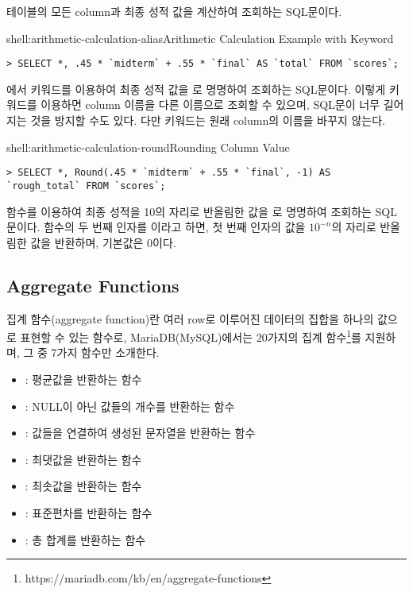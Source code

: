 \은  테이블의 모든 column과 최종 성적 값을 계산하여 조회하는 SQL문이다.

\begin{shellenv}{shell:arithmetic-calculation-alias}{Arithmetic Calculation Example with  Keyword}\begin{verbatim}
> SELECT *, .45 * `midterm` + .55 * `final` AS `total` FROM `scores`;
\end{verbatim}
\end{shellenv}

\은 에서  키워드를 이용하여 최종 성적 값을 로 명명하여 조회하는 SQL문이다. 이렇게  키워드를 이용하면 column 이름을 다른 이름으로 조회할 수 있으며, SQL문이 너무 길어지는 것을 방지할 수도 있다. 다만  키워드는 원래 column의 이름을 바꾸지 않는다.

\begin{shellenv}{shell:arithmetic-calculation-round}{Rounding Column Value}\begin{verbatim}
> SELECT *, Round(.45 * `midterm` + .55 * `final`, -1) AS `rough_total` FROM `scores`;
\end{verbatim}
\end{shellenv}

\는  함수를 이용하여 최종 성적을 10의 자리로 반올림한 값을 로 명명하여 조회하는 SQL문이다.  함수의 두 번째 인자를 이라고 하면, 첫 번째 인자의 값을 $10^{-n}$의 자리로 반올림한 값을 반환하며, 기본값은 0이다.

\subsection*{Aggregate Functions}

집계 함수(aggregate function)란 여러 row로 이루어진 데이터의 집합을 하나의 값으로 표현할 수 있는 함수로, MariaDB(MySQL)에서는 20가지의 집계 함수\footnote{https://mariadb.com/kb/en/aggregate-functions}를 지원하며, 그 중 7가지 함수만 소개한다.

\begin{itemize}
    \item {}: 평균값을 반환하는 함수
    \item {}: NULL이 아닌 값들의 개수를 반환하는 함수
    \item {}: 값들을 연결하여 생성된 문자열을 반환하는 함수
    \item {}: 최댓값을 반환하는 함수
    \item {}: 최솟값을 반환하는 함수
    \item {}: 표준편차를 반환하는 함수
    \item {}: 총 합계를 반환하는 함수
\end{itemize}

